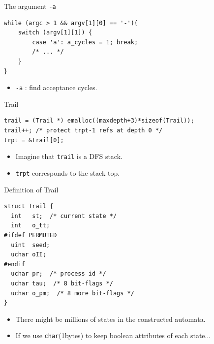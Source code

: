 \documentclass[12pt]{beamer}
\newcommand{\code}[1]{\texttt{#1}}
\begin{document}
\begin{frame}[fragile]{The argument \code{-a}}
\begin{lstlisting}[basicstyle=\normalsize\ttfamily]
while (argc > 1 && argv[1][0] == '-'){ 
    switch (argv[1][1]) {
        case 'a': a_cycles = 1; break;
        /* ... */
    }
}\end{lstlisting}
 	\begin{itemize}
 		\item \code{-a} : find acceptance cycles.
 	\end{itemize}
\end{frame}  


\begin{frame}[fragile]{Trail}
\begin{lstlisting}[basicstyle=\normalsize\ttfamily]
trail = (Trail *) emalloc((maxdepth+3)*sizeof(Trail));
trail++; /* protect trpt-1 refs at depth 0 */
trpt = &trail[0];
\end{lstlisting}
 	\begin{itemize}
		\item Imagine that \code{trail} is a DFS stack.
 		\item \code{trpt} corresponds to the stack top.
 	\end{itemize}
\end{frame}

\begin{frame}[fragile]{Definition of Trail}
\begin{lstlisting}[basicstyle=\normalsize\ttfamily]
struct Trail {
  int   st;  /* current state */
  int   o_tt;
#ifdef PERMUTED
  uint  seed;
  uchar oII;
#endif
  uchar pr;  /* process id */
  uchar tau;  /* 8 bit-flags */
  uchar o_pm;  /* 8 more bit-flags */
}
\end{lstlisting}
\begin{itemize}
	\item There might be millions of states in the constructed automata.
	\item If we use \code{char}(1bytes) to keep boolean attributes of each state...
\end{itemize}
\end{frame}
\end{document}
